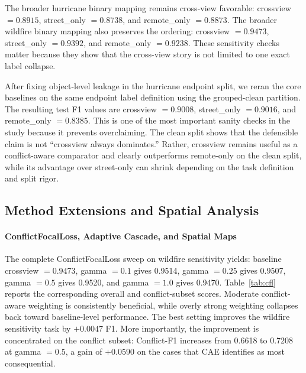 \documentclass[sigconf]{acmart}
\begin{document}
The broader hurricane binary mapping remains cross-view favorable:
crossview $= 0.8915$, street\_only $= 0.8738$, and remote\_only $= 0.8873$.
The broader wildfire binary mapping also preserves the ordering:
crossview $= 0.9473$, street\_only $= 0.9392$, and remote\_only $= 0.9238$.
These sensitivity checks matter because they show that the cross-view story is
not limited to one exact label collapse.

After fixing object-level leakage in the hurricane endpoint split, we reran the
core baselines on the same endpoint label definition using the grouped-clean
partition. The resulting test F1 values are
crossview $= 0.9008$, street\_only $= 0.9016$, and remote\_only $= 0.8385$.
This is one of the most important sanity checks in the study because it
prevents overclaiming. The clean split shows that the defensible claim is not
``crossview always dominates.'' Rather, crossview remains useful as a
conflict-aware comparator and clearly outperforms remote-only on the clean
split, while its advantage over street-only can shrink depending on the task
definition and split rigor.

\subsection{Method Extensions and Spatial Analysis}

\paragraph{ConflictFocalLoss, Adaptive Cascade, and Spatial Maps}

The complete ConflictFocalLoss sweep on wildfire sensitivity yields:
baseline crossview $= 0.9473$, gamma $= 0.1$ gives 0.9514, gamma $= 0.25$
gives 0.9507, gamma $= 0.5$ gives 0.9520, and gamma $= 1.0$ gives 0.9470.
Table~\ref{tab:cfl} reports the corresponding overall and conflict-subset
scores. Moderate conflict-aware weighting is consistently beneficial, while
overly strong weighting collapses back toward baseline-level performance. The
best setting improves the wildfire sensitivity task by $+0.0047$ F1. More
importantly, the improvement is concentrated on the conflict subset:
Conflict-F1 increases from 0.6618 to 0.7208 at gamma $= 0.5$, a gain of
$+0.0590$ on the cases that CAE identifies as most consequential.
\end{document}
